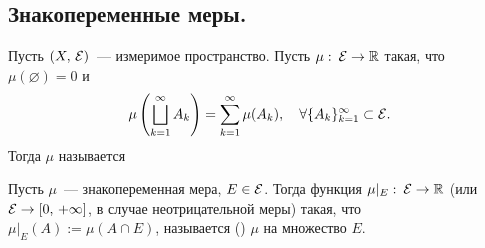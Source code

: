 \newpage
{}

\subsection{Знакопеременные меры.}

\begin{definition}
    Пусть $(X,\, \mathcal{E})$~--- измеримое пространство.
    Пусть $\mu:\: \mathcal{E}\to\mathbb{R}$ такая, что $\mu(\varnothing)=0$ и \[
        \mu\left(\bigsqcup_{k=1}^{\infty}A_k\right)
        =\sum_{k=1}^{\infty}\mu(A_k),\quad\forall
        \{A_k\}_{k=1}^{\infty}\subset\mathcal{E}.
    \]
    Тогда $\mu$ называется 

    \begin{remark}
        Пусть $\mu$~--- знакопеременная мера, $E\in\mathcal{E}$.
        Тогда функция $\mu|_E:\:\mathcal{E}\to\mathbb{R}$ (или $\mathcal{E}\to[0,\, +\infty]$, в случае неотрицательной меры)
        такая, что $\mu|_E(A):=\mu(A\cap E)$, называется  ()
        $\mu$ на множество $E$.
    \end{remark}
\end{definition}

